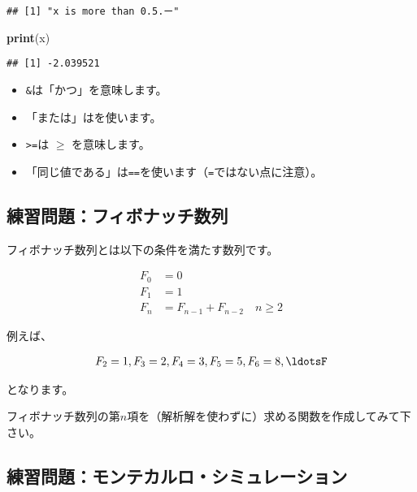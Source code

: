 \documentclass[]{bxjsarticle}
\newenvironment{Shaded}{\begin{snugshade}}{\end{snugshade}}
\newcommand{\KeywordTok}[1]{\textcolor[rgb]{0.13,0.29,0.53}{\textbf{#1}}}
\newcommand{\NormalTok}[1]{#1}
\providecommand{\tightlist}{%
  \setlength{\itemsep}{0pt}\setlength{\parskip}{0pt}}
\begin{document}
\begin{verbatim}
## [1] "x is more than 0.5.ー"
\end{verbatim}

\begin{Shaded}
\begin{Highlighting}[]
\KeywordTok{print}\NormalTok{(x)}
\end{Highlighting}
\end{Shaded}

\begin{verbatim}
## [1] -2.039521
\end{verbatim}

\begin{itemize}
\tightlist
\item
  \texttt{\&}は「かつ」を意味します。
\item
  「または」は\texttt{\textbar{}}を使います。
\item
  \texttt{\textgreater{}=}は \(\geq\) を意味します。
\item
  「同じ値である」は\texttt{==}を使います（\texttt{=}ではない点に注意）。
\end{itemize}

\hypertarget{ux7df4ux7fd2ux554fux984cux30d5ux30a3ux30dcux30caux30c3ux30c1ux6570ux5217}{%
\subsection{練習問題：フィボナッチ数列}\label{ux7df4ux7fd2ux554fux984cux30d5ux30a3ux30dcux30caux30c3ux30c1ux6570ux5217}}

フィボナッチ数列とは以下の条件を満たす数列です。

\[
\begin{align}
  F_0 &= 0 \\
  F_1 &= 1 \\
  F_{n} &= F_{n-1} + F_{n-2} \quad n \geq 2
\end{align}
\]

例えば、

\[
\begin{align}
  F_2 = 1, F_3 = 2, F_4 = 3, F_5 = 5, F_6 = 8,\ldotsF
\end{align}
\]

となります。

フィボナッチ数列の第\(n\)項を（解析解を使わずに）求める関数を作成してみて下さい。

\hypertarget{ux7df4ux7fd2ux554fux984cux30e2ux30f3ux30c6ux30abux30ebux30edux30b7ux30dfux30e5ux30ecux30fcux30b7ux30e7ux30f3}{%
\subsection{練習問題：モンテカルロ・シミュレーション}\label{ux7df4ux7fd2ux554fux984cux30e2ux30f3ux30c6ux30abux30ebux30edux30b7ux30dfux30e5ux30ecux30fcux30b7ux30e7ux30f3}}
\end{document}
